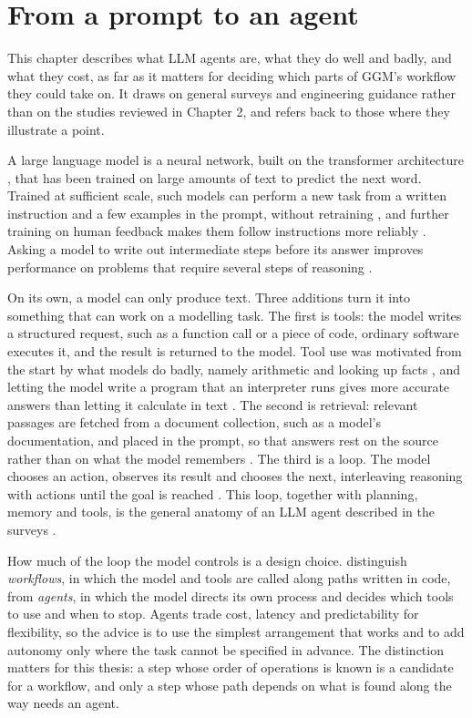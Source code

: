 \section{From a prompt to an agent}

This chapter describes what LLM agents are, what they do well and badly, and what they cost, as far as it matters for deciding which parts of GGM's workflow they could take on.
It draws on general surveys and engineering guidance rather than on the studies reviewed in Chapter 2, and refers back to those where they illustrate a point.

A large language model is a neural network, built on the transformer architecture \citep{vaswani2017attention}, that has been trained on large amounts of text to predict the next word.
Trained at sufficient scale, such models can perform a new task from a written instruction and a few examples in the prompt, without retraining \citep{brown2020language}, and further training on human feedback makes them follow instructions more reliably \citep{ouyang2022training}.
Asking a model to write out intermediate steps before its answer improves performance on problems that require several steps of reasoning \citep{wei2022chain}.

On its own, a model can only produce text.
Three additions turn it into something that can work on a modelling task.
The first is tools: the model writes a structured request, such as a function call or a piece of code, ordinary software executes it, and the result is returned to the model.
Tool use was motivated from the start by what models do badly, namely arithmetic and looking up facts \citep{schick2023toolformer}, and letting the model write a program that an interpreter runs gives more accurate answers than letting it calculate in text \citep{gao2022pal}.
The second is retrieval: relevant passages are fetched from a document collection, such as a model's documentation, and placed in the prompt, so that answers rest on the source rather than on what the model remembers \citep{lewis2020retrieval}.
The third is a loop.
The model chooses an action, observes its result and chooses the next, interleaving reasoning with actions until the goal is reached \citep{yao2023react}.
This loop, together with planning, memory and tools, is the general anatomy of an LLM agent described in the surveys \citep{wang2024survey}.

How much of the loop the model controls is a design choice.
\citet{schluntz2024building} distinguish \emph{workflows}, in which the model and tools are called along paths written in code, from \emph{agents}, in which the model directs its own process and decides which tools to use and when to stop.
Agents trade cost, latency and predictability for flexibility, so the advice is to use the simplest arrangement that works and to add autonomy only where the task cannot be specified in advance.
The distinction matters for this thesis: a step whose order of operations is known is a candidate for a workflow, and only a step whose path depends on what is found along the way needs an agent.

